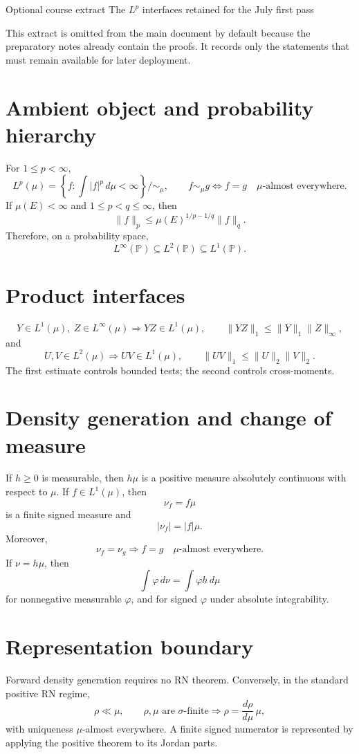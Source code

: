 \sheettitle
  {Optional course extract}
  {The $L^p$ interfaces retained for the July first pass}

This extract is omitted from the main document by default because the preparatory notes already contain the proofs. It records only the statements that must remain available for later deployment.

\section*{Ambient object and probability hierarchy}

For $1\le p<\infty$,
\[
L^p(\mu)
=
\left\{f:\int|f|^p\,d\mu<\infty\right\}\big/\!\sim_\mu,
\qquad
f\sim_\mu g
\Longleftrightarrow
f=g\quad\mu\text{-almost everywhere}.
\]
If $\mu(E)<\infty$ and $1\le p<q\le\infty$, then
\[
\|f\|_p
\le
\mu(E)^{1/p-1/q}\|f\|_q.
\]
Therefore, on a probability space,
\[
L^\infty(\mathbb P)
\subseteq
L^2(\mathbb P)
\subseteq
L^1(\mathbb P).
\]

\section*{Product interfaces}

\[
Y\in L^1(\mu),\ Z\in L^\infty(\mu)
\Longrightarrow
YZ\in L^1(\mu),
\qquad
\|YZ\|_1\le\|Y\|_1\|Z\|_\infty,
\]
and
\[
U,V\in L^2(\mu)
\Longrightarrow
UV\in L^1(\mu),
\qquad
\|UV\|_1\le\|U\|_2\|V\|_2.
\]
The first estimate controls bounded tests; the second controls cross-moments.

\section*{Density generation and change of measure}

If $h\ge0$ is measurable, then $h\mu$ is a positive measure absolutely continuous with respect to $\mu$. If $f\in L^1(\mu)$, then
\[
\nu_f=f\mu
\]
is a finite signed measure and
\[
|\nu_f|=|f|\mu.
\]
Moreover,
\[
\nu_f=\nu_g
\Longrightarrow
f=g\quad\mu\text{-almost everywhere}.
\]
If $\nu=h\mu$, then
\[
\int\varphi\,d\nu
=
\int\varphi h\,d\mu
\]
for nonnegative measurable $\varphi$, and for signed $\varphi$ under absolute integrability.

\section*{Representation boundary}

Forward density generation requires no RN theorem. Conversely, in the standard positive RN regime,
\[
\rho\ll\mu,
\qquad
\rho,\mu\text{ are }\sigma\text{-finite}
\Longrightarrow
\rho=\frac{d\rho}{d\mu}\,\mu,
\]
with uniqueness $\mu$-almost everywhere. A finite signed numerator is represented by applying the positive theorem to its Jordan parts.

